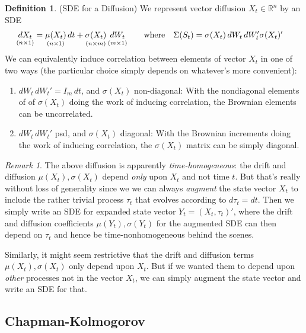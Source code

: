 \documentclass[12pt]{article}
\theoremstyle{plain}
\theoremstyle{definition}
\newtheorem{defn}[thm]{Definition}
\theoremstyle{remark}
\newtheorem*{rmk}{Remark}
\newcommand{\Rn}{\mathbb{R}^n}
\begin{document}
\begin{defn}(SDE for a Diffusion)
\label{diffusionSDE}
We represent vector diffusion $X_t\in\Rn$ by an SDE
\begin{align}
  \underset{(n\times 1)}{%
    dX_t
    \vphantom{x}
  }
  &=
  \underset{(n\times 1)}{%
    \mu(X_t)
    \vphantom{x}
  }
  \,dt
  +
  \underset{(n\times m)}{%
    \sigma(X_t)
    \vphantom{\mu}
  }
  \,
  \underset{(m\times 1)}{%
    dW_t
    \vphantom{\mu}
  }
  \qquad\text{where}\quad
  \Sigma(S_t)=\sigma(X_t)\,dW_t\,dW_t'\sigma(X_t)'
  \label{sdemulti}
\end{align}
We can equivalently induce correlation between elements of vector $X_t$
in one of two ways (the particular choice simply depends on whatever's
more convenient):
\begin{enumerate}[label=(\roman*)]
  \item $dW_t\,dW_t'=I_m\,dt$, and $\sigma(X_t)$ non-diagonal:
    With the nondiagonal elements of of $\sigma(X_t)$ doing the work of
    inducing correlation, the Brownian elements can be uncorrelated.
  \item $dW_t\,dW_t'$ psd, and $\sigma(X_t)$ diagonal:
    With the Brownian increments doing the work of inducing correlation,
    the $\sigma(X_t)$ matrix can be simply diagonal.
\end{enumerate}
\end{defn}
\begin{rmk}
The above diffusion is apparently \emph{time-homogeneous}: the drift and
diffusion $\mu(X_t),\sigma(X_t)$ depend \emph{only} upon $X_t$ and not
time $t$.
But that's really without loss of generality since we we can always
\emph{augment} the state vector $X_t$ to include the rather trivial
process $\tau_t$ that evolves according to $d\tau_t=dt$.
Then we simply write an SDE for expanded state vector
$Y_t=(X_t,\tau_t)'$, where the drift and diffusion coefficients
$\mu(Y_t),\sigma(Y_t)$ for the augmented SDE can then depend on $\tau_t$
and hence be time-nonhomogeneous behind the scenes.

Similarly, it might seem restrictive that the drift and diffusion terms
$\mu(X_t),\sigma(X_t)$ only depend upon $X_t$. But if we wanted them to
depend upon \emph{other} processes not in the vector $X_t$, we can
simply augment the state vector and write an SDE for that.
\end{rmk}


\subsection{Chapman-Kolmogorov}
\end{document}
